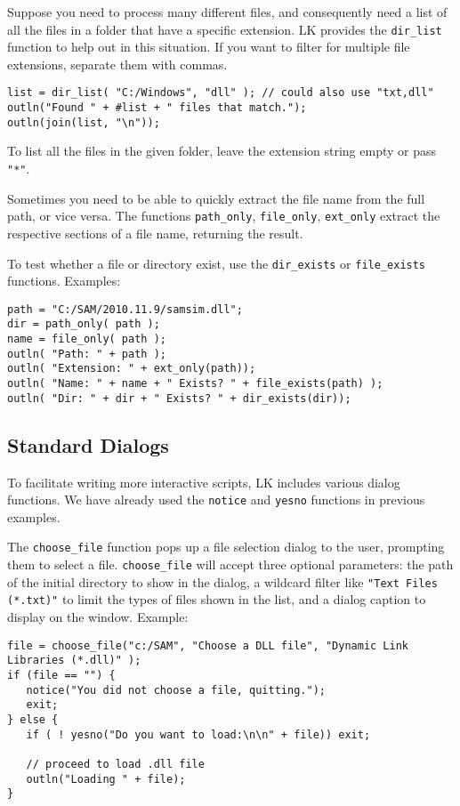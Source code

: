 \documentclass{article}
\begin{document}
Suppose you need to process many different files, and consequently need a list of all the files in a folder that have a specific extension.  LK provides the \texttt{dir\_list} function to help out in this situation.  If you want to filter for multiple file extensions, separate them with commas.

\begin{verbatim}
list = dir_list( "C:/Windows", "dll" ); // could also use "txt,dll"
outln("Found " + #list + " files that match.");
outln(join(list, "\n"));
\end{verbatim}

To list all the files in the given folder, leave the extension string empty or pass \texttt{"*"}.

Sometimes you need to be able to quickly extract the file name from the full path, or vice versa.  The functions \texttt{path\_only}, \texttt{file\_only}, \texttt{ext\_only} extract the respective sections of a file name, returning the result.

To test whether a file or directory exist, use the \texttt{dir\_exists} or \texttt{file\_exists} functions.  Examples:

\begin{verbatim}
path = "C:/SAM/2010.11.9/samsim.dll";
dir = path_only( path );
name = file_only( path );
outln( "Path: " + path );
outln( "Extension: " + ext_only(path));
outln( "Name: " + name + " Exists? " + file_exists(path) );
outln( "Dir: " + dir + " Exists? " + dir_exists(dir));
\end{verbatim}

\subsection{Standard Dialogs}

To facilitate writing more interactive scripts, LK includes various dialog functions.  We have already used the \texttt{notice} and \texttt{yesno} functions in previous examples.

The \texttt{choose\_file} function pops up a file selection dialog to the user, prompting them to select a file.  \texttt{choose\_file} will accept three optional parameters: the path of the initial directory to show in the dialog, a wildcard filter like \texttt{"Text Files (*.txt)"} to limit the types of files shown in the list, and a dialog caption to display on the window.  Example:

\begin{verbatim}
file = choose_file("c:/SAM", "Choose a DLL file", "Dynamic Link Libraries (*.dll)" );
if (file == "") {
   notice("You did not choose a file, quitting.");
   exit;
} else {
   if ( ! yesno("Do you want to load:\n\n" + file)) exit;
   
   // proceed to load .dll file
   outln("Loading " + file);
}
\end{verbatim}
\end{document}
